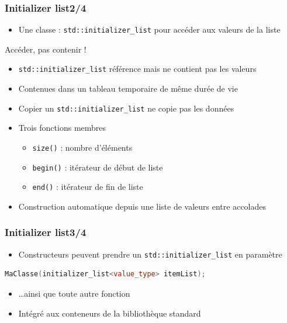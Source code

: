 \documentclass[C++.tex]{subfiles}
\begin{document}
\begin{frame}[fragile]
	\frametitle{Initializer list\titlehfill{}2/4}
	\begin{itemize}
		\item Une classe : \lstinline|std::initializer_list| pour accéder aux valeurs de la liste
	\end{itemize}

	\begin{alertblock}{Accéder, pas contenir !}
		\begin{itemize}
			\item \lstinline|std::initializer_list| référence mais ne contient pas les valeurs
			\item Contenues dans un tableau temporaire de même durée de vie
			\item Copier un \lstinline|std::initializer_list| ne copie pas les données
		\end{itemize}
	\end{alertblock}		

	\begin{itemize}
		\item Trois fonctions membres
		\begin{itemize}
			\item \lstinline|size()| : nombre d'éléments
			\item \lstinline|begin()| : itérateur de début de liste
			\item \lstinline|end()| : itérateur de fin de liste
		\end{itemize}
		\item Construction automatique depuis une liste de valeurs entre accolades
	\end{itemize}
\end{frame}

\begin{frame}[fragile]
	\frametitle{Initializer list\titlehfill{}3/4}
	\begin{itemize}
		\item Constructeurs peuvent prendre un \lstinline|std::initializer_list| en paramètre
	\end{itemize}

	\begin{lstlisting}[language=C++]
MaClasse(initializer_list<value_type> itemList);\end{lstlisting}

	\begin{itemize}
		\item \ldots ainsi que toute autre fonction
		\item Intégré aux conteneurs de la bibliothèque standard
	\end{itemize}
\end{frame}
\end{document}
